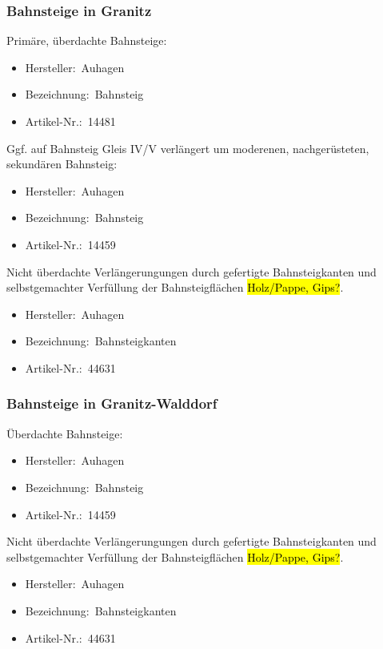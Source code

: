 \subsubsection{Bahnsteige in Granitz}

Prim\"are, \"uberdachte Bahnsteige:
\begin{itemize}
	\item[] Hersteller:~Auhagen
	\item[] Bezeichnung:~Bahnsteig
	\item[] Artikel-Nr.:~14481
\end{itemize}
Ggf. auf Bahnsteig Gleis IV/V verl\"angert um moderenen, nachger\"usteten, sekund\"aren Bahnsteig:
\begin{itemize}
	\item[] Hersteller:~Auhagen
	\item[] Bezeichnung:~Bahnsteig
	\item[] Artikel-Nr.:~14459
\end{itemize}

Nicht \"uberdachte Verl\"angerungungen durch gefertigte Bahnsteigkanten und selbstgemachter Verf\"ullung der Bahnsteigfl\"achen \hl{Holz/Pappe, Gips?}.
\begin{itemize}
	\item[] Hersteller:~Auhagen
	\item[] Bezeichnung:~Bahnsteigkanten
	\item[] Artikel-Nr.:~44631
\end{itemize}

\subsubsection{Bahnsteige in Granitz-Walddorf}

\"Uberdachte Bahnsteige:
\begin{itemize}
	\item[] Hersteller:~Auhagen
	\item[] Bezeichnung:~Bahnsteig
	\item[] Artikel-Nr.:~14459
\end{itemize}

Nicht \"uberdachte Verl\"angerungungen durch gefertigte Bahnsteigkanten und selbstgemachter Verf\"ullung der Bahnsteigfl\"achen \hl{Holz/Pappe, Gips?}.
\begin{itemize}
	\item[] Hersteller:~Auhagen
	\item[] Bezeichnung:~Bahnsteigkanten
	\item[] Artikel-Nr.:~44631
\end{itemize}



